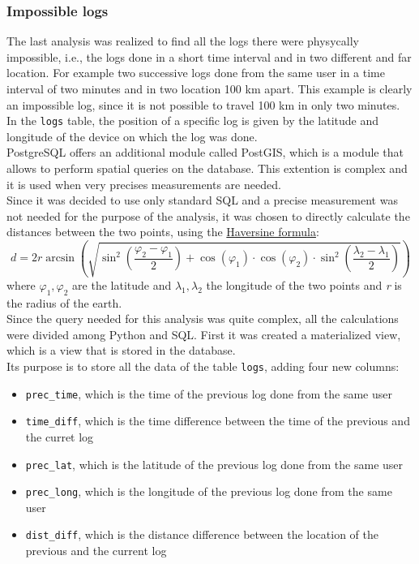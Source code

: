 \documentclass[12pt, a4paper, oneside]{article}
\begin{document}
\subsubsection{Impossible logs}
The last analysis was realized to find all the logs there were physycally impossible, i.e., the logs done in a short time interval and in two different and far location.
For example two successive logs done from the same user in a time interval of two minutes and in two location 100 km apart. This example is clearly an impossible log, since it is not possible to travel 100 km
in only two minutes.\\
In the \texttt{logs} table, the position of a specific log is given by the latitude and longitude of the device on which the log was done.\\
PostgreSQL offers an additional module called PostGIS, which is a module that allows to perform spatial queries on the database. This extention is complex and it is used when very precises measurements are
needed.\\
Since it was decided to use only standard SQL and a precise measurement was not needed for the purpose of the analysis, it was chosen to directly calculate the distances between the two points, using the
\href{https://en.wikipedia.org/wiki/Haversine_formula}{Haversine formula}:
\[
    d = 2r\arcsin \left( \sqrt{ \sin^2\left(\frac{\varphi_2 - \varphi_1} {2}\right) + \cos(\varphi_1)\cdot\cos(\varphi_2) \cdot \sin^2\left(\frac{\lambda_2 - \lambda_1} {2}\right) } \right)
\]
where $\varphi_1, \varphi_2$ are the latitude and $\lambda_1, \lambda_2$ the longitude of the two points and \emph{r} is the radius of the earth.\\
Since the query needed for this analysis was quite complex, all the calculations were divided among Python and SQL.
First it was created a materialized view, which is a view that is stored in the database.\\ Its purpose is to store all the data of the table \texttt{logs}, adding four new columns:
\begin{itemize}
    \item \texttt{prec\_time}, which is the time of the previous log done from the same user
    \item \texttt{time\_diff}, which is the time difference between the time of the previous and the curret log
    \item \texttt{prec\_lat}, which is the latitude of the previous log done from the same user
    \item \texttt{prec\_long}, which is the longitude of the previous log done from the same user
    \item \texttt{dist\_diff}, which is the distance difference between the location of the previous and the current log
\end{itemize}
\end{document}
